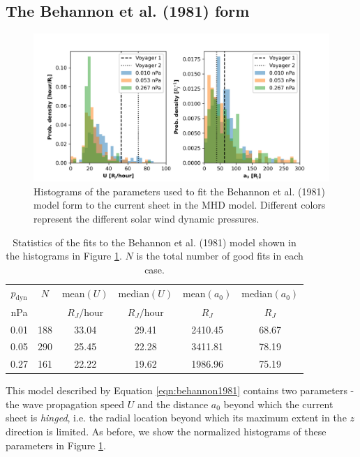 \subsection{The Behannon et al. (1981) form}
\begin{figure}
    \centering
    \includegraphics[width=\textwidth]{images5/comparison_highdynP_behannon.png}
    \caption{Histograms of the parameters used to fit the Behannon et al. (1981) model form to the current sheet in the MHD model. Different colors represent the different solar wind dynamic pressures.}
    \label{fig:comparison-hist-behannon}
\end{figure}

\begin{table}
    \centering
    \begin{tabular}{c|c|c|c|c|c}
     $p_\text{dyn}$ &      $N$&  mean$(U)$&  median$(U)$&  mean$(a_0)$&  median$(a_0)$\\
     nPa&   &   $R_J/$hour& $R_J/$hour& $R_J$& $R_J$\\
     \hline
     0.01 & 188 &   33.04 &     29.41 &  2410.45 &      68.67 \\
     0.05 & 290 &   25.45 &     22.28 &  3411.81 &      78.19 \\
     0.27 & 161 &   22.22 &     19.62 &  1986.96 &      75.19 \\
    \end{tabular}
    \caption{Statistics of the fits to the Behannon et al. (1981) model shown in the histograms in Figure \protect\ref{fig:comparison-hist-behannon}. $N$ is the total number of good fits in each case.}
    \label{tab:comparison-behannon}
\end{table}

This model described by Equation \ref{eqn:behannon1981} contains two parameters - the wave propagation speed $U$ and the distance $a_0$ beyond which the current sheet is \emph{hinged}, i.e. the radial location beyond which its maximum extent in the $z$ direction is limited. As before, we show the normalized histograms of these parameters in Figure \ref{fig:comparison-hist-behannon}. 

